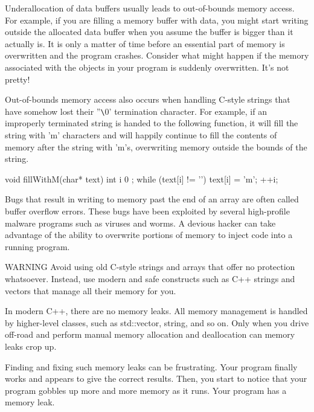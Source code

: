 Underallocation of data buffers usually leads to out-of-bounds memory access. For example, if you are filling a memory buffer with data, you might start writing outside the allocated data buffer when you assume the buffer is bigger than it actually is. It is only a matter of time before an essential part of memory is overwritten and the program crashes. Consider what might happen if the memory associated with the objects in your program is suddenly overwritten. It’s not pretty!

Out-of-bounds memory access also occurs when handling C-style strings that have somehow lost their ''\verb|\|0' termination character. For example, if an improperly terminated string is handed to the following function, it will fill the string with 'm' characters and will happily continue to fill the contents of memory after the string with 'm's, overwriting memory outside the bounds of the string.

\begin{cpp}
void fillWithM(char* text)
{
    int i { 0 };
    while (text[i] != '\0') {
        text[i] = 'm';
        ++i;
    }
}
\end{cpp}

Bugs that result in writing to memory past the end of an array are often called buffer overflow errors. These bugs have been exploited by several high-profile malware programs such as viruses and worms. A devious hacker can take advantage of the ability to overwrite portions of memory to inject code into a running program.

\begin{myWarning}{WARNING}
Avoid using old C-style strings and arrays that offer no protection whatsoever. Instead, use modern and safe constructs such as C++ strings and vectors that manage all their memory for you.
\end{myWarning}


In modern C++, there are no memory leaks. All memory management is handled by higher-level classes, such as std::vector, string, and so on. Only when you drive off-road and perform manual memory allocation and deallocation can memory leaks crop up.

Finding and fixing such memory leaks can be frustrating. Your program finally works and appears to give the correct results. Then, you start to notice that your program gobbles up more and more memory as it runs. Your program has a memory leak.

